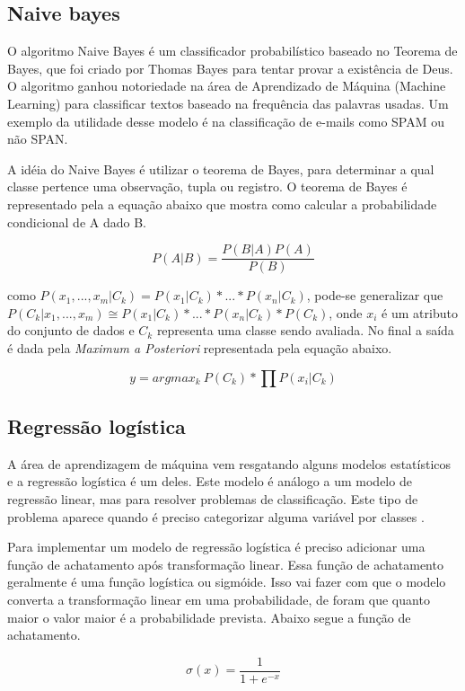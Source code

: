 \documentclass[diss,capa]{texufpel}
\begin{document}
\subsection{Naive bayes}

O algoritmo Naive Bayes é um classificador probabilístico baseado no Teorema de Bayes, que foi criado por Thomas Bayes para tentar provar a existência de Deus.
O algoritmo ganhou notoriedade na área de Aprendizado de Máquina (Machine Learning) para classificar textos baseado na frequência das palavras usadas. Um exemplo da utilidade desse modelo é na classificação de e-mails como SPAM ou não SPAN.

A idéia do Naive Bayes é utilizar o teorema de Bayes, para determinar a qual classe pertence uma observação, tupla ou registro. O teorema de Bayes é representado pela a equação abaixo que mostra como calcular a probabilidade condicional de A dado B.

\[P(A|B) = \frac{P(B|A)P(A)}{P(B)}\]

como \(P(x_{1},...,x_{m}|C_{k}) = P(x_{1}|C_{k}) * ... * P(x_{n}|C_{k})\), pode-se generalizar que \(P(C_{k}|x_{1},...,x_{m}) \cong P(x_{1}|C_{k}) * ... * P(x_{n}|C_{k}) * P(C_{k})\), onde \(x_{i}\) é um atributo do conjunto de dados e \(C_{k}\) representa uma classe sendo avaliada. No final a saída é dada pela \textit{Maximum a Posteriori} representada pela equação abaixo.

\[y = argmax_{k}\ P(C_{k}) * \prod P(x_{i}|C_{k})\]

\subsection{Regressão logística}

A área de aprendizagem de máquina vem resgatando alguns modelos estatísticos e a regressão logística é um deles. Este modelo é análogo a um modelo de regressão linear, mas para resolver problemas de classificação. Este tipo de problema aparece quando é preciso categorizar alguma variável por classes \cite{hosmer2013applied}.

Para implementar um modelo de regressão logística é preciso adicionar uma função de achatamento após transformação linear. Essa função de achatamento geralmente é uma função logística ou sigmóide. Isso vai fazer com que o modelo converta a transformação linear em uma probabilidade, de foram que quanto maior o valor maior é a probabilidade prevista. Abaixo segue a função de achatamento.

\[\sigma(x) = \frac{1}{1 + e^{-x}}\]
\end{document}
